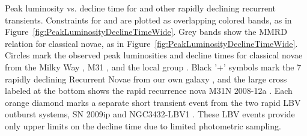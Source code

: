\label{fig:PeakLuminosityDeclineTime}
Peak luminosity vs. decline time for \spock and other rapidly
declining recurrent transients.  Constraints for \spockone
and \spocktwo are plotted as overlapping colored bands, as in
Figure~\ref{fig:PeakLuminosityDeclineTimeWide}.  Grey bands show the
MMRD relation for classical novae, as in
Figure~\ref{fig:PeakLuminosityDeclineTimeWide}.  Circles mark the
observed peak luminosities and decline times for classical novae from
the Milky Way \citep{Downes:2000}, M31 \citep{Shafter:2011}, and the
local group \citep{Kasliwal:2011b}.  Black '+' symbols mark the 7
rapidly declining Recurrent Novae from our own
galaxy \citep{Schaefer:2010}, and the large cross labeled at the
bottom shows the rapid recurrence nova M31N
2008-12a \citep{Tang:2014,Darnley:2015}.  Each orange diamond marks a
separate short transient event from the two rapid LBV outburst
systems, SN 2009ip \citep{Pastorello:2013} and
NGC3432-LBV1 \citep[a.k.a. SN 2000ch][]{Pastorello:2010}.  These LBV
events provide only upper limits on the decline time due to limited
photometric sampling.
